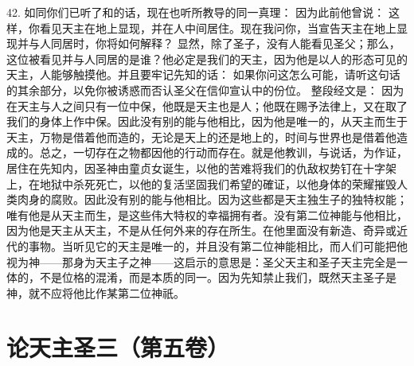 42. 如同你们已听了和的话，现在也听所教导的同一真理： 因为此前他曾说： 这样，你看见天主在地上显现，并在人中间居住。现在我问你，当宣告天主在地上显现并与人同居时，你将如何解释？ 显然，除了圣子，没有人能看见圣父；那么，这位被看见并与人同居的是谁？他必定是我们的天主，因为他是以人的形态可见的天主，人能够触摸他。并且要牢记先知的话： 如果你问这怎么可能，请听这句话的其余部分，以免你被诱惑而否认圣父在信仰宣认中的份位。 整段经文是： 因为在天主与人之间只有一位中保，他既是天主也是人；他既在赐予法律上，又在取了我们的身体上作中保。因此没有别的能与他相比，因为他是唯一的，从天主而生于天主，万物是借着他而造的，无论是天上的还是地上的，时间与世界也是借着他造成的。总之，一切存在之物都因他的行动而存在。就是他教训，与说话，为作证，居住在先知内，因圣神由童贞女诞生，以他的苦难将我们的仇敌权势钉在十字架上，在地狱中杀死死亡，以他的复活坚固我们希望的確证，以他身体的荣耀摧毁人类肉身的腐败。因此没有别的能与他相比。因为这些都是天主独生子的独特权能；唯有他是从天主而生，是这些伟大特权的幸福拥有者。没有第二位神能与他相比，因为他是天主从天主，不是从任何外来的存在所生。在他里面没有新造、奇异或近代的事物。当听见它的天主是唯一的，并且没有第二位神能相比，而人们可能把他视为神——那身为天主子之神——这启示的意思是：圣父天主和圣子天主完全是一体的，不是位格的混淆，而是本质的同一。因为先知禁止我们，既然天主圣子是神，就不应将他比作某第二位神祇。\par



\section{论天主圣三（第五卷）}

